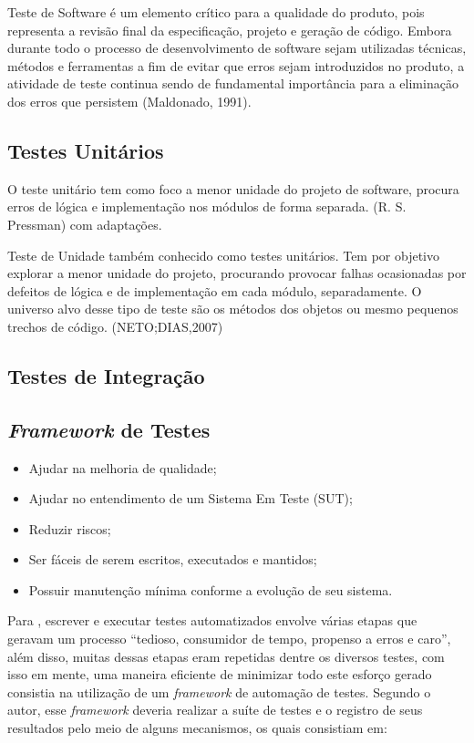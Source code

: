 Teste de Software é um elemento crítico para a qualidade do produto, pois representa a revisão final da especificação, projeto e geração de código. Embora durante todo o processo de desenvolvimento de software sejam utilizadas técnicas, métodos e ferramentas a fim de evitar que erros sejam introduzidos no produto, a atividade de teste continua sendo de fundamental importância para a eliminação dos erros que persistem (Maldonado, 1991).

    \subsection{Testes Unitários}
        O teste unitário tem como foco a menor unidade do projeto de software, procura erros de lógica e implementação nos módulos de forma separada. (R. S. Pressman) com adaptações.

         Teste de Unidade também conhecido como testes unitários. Tem por objetivo explorar a menor unidade do projeto, procurando provocar falhas ocasionadas por defeitos de lógica e de implementação em cada módulo, separadamente. O universo alvo desse tipo de teste são os métodos dos objetos ou mesmo pequenos trechos de código. (NETO;DIAS,2007)
        
        

    \subsection{Testes de Integração}
        

    \subsection{\textit{Framework} de Testes}
        

        \begin{itemize}

        \item Ajudar na melhoria de qualidade;
        \item Ajudar no entendimento de um Sistema Em Teste (SUT);
        \item Reduzir riscos;
        \item Ser fáceis de serem escritos, executados e mantidos;
        \item Possuir manutenção mínima conforme a evolução de seu sistema.

        \end{itemize}

        Para , escrever e executar testes automatizados envolve várias etapas que geravam um processo “tedioso, consumidor de tempo, propenso a erros e caro”, além disso, muitas dessas etapas eram repetidas dentre os diversos testes, com isso em mente, uma maneira eficiente de minimizar todo este esforço gerado consistia na utilização de um \textit{framework} de automação de testes. Segundo o autor, esse \textit{framework} deveria realizar a suíte de testes e o registro de seus resultados pelo meio de alguns mecanismos, os quais consistiam em:

